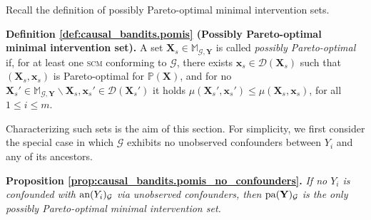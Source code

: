 Recall the definition of possibly Pareto-optimal minimal intervention sets.

\textbf{Definition \ref{def:causal_bandits.pomis} \textnormal{(Possibly Pareto-optimal minimal intervention set)}.}
    A set $\mathbf{X}_s \in \mathbb{M}_{\mathcal{G},\mathbf{Y}}$ is called \textit{possibly Pareto-optimal} if, for at least one \textsc{scm} conforming to $\mathcal{G}$, there exists $\mathbf{x}_s \in \mathcal{D}(\mathbf{X}_s)$ such that $(\mathbf{X}_s,\mathbf{x}_s)$ is Pareto-optimal for $\mathbb{P}(\mathbf{X})$, and for no $\mathbf{X}_s' \in \mathbb{M}_{\mathcal{G},\mathbf{Y}} \backslash \mathbf{X}_s, \mathbf{x}_s' \in \mathcal{D}(\mathbf{X}_s')$ it holds $\mu(\mathbf{X}_s',\mathbf{x}_s') \leq \mu(\mathbf{X}_s,\mathbf{x}_s)$, for all $1\leq i \leq m$.

Characterizing such sets is the aim of this section. For simplicity, we first consider the special case in which $\mathcal{G}$ exhibits no unobserved confounders between $Y_i$ and any of its ancestors. 

\textbf{Proposition \ref{prop:causal_bandits.pomis_no_confounders}.} \textit{If no $Y_i$ is confounded with $\textnormal{an}(Y_i)_{\mathcal{G}}$ via unobserved confounders, then $\textnormal{pa}(\mathbf{Y})_{\mathcal{G}}$ is the only possibly Pareto-optimal minimal intervention set.}


